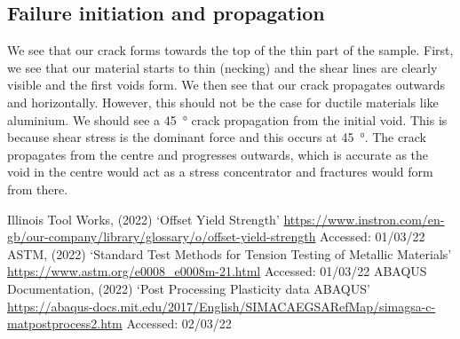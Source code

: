 \documentclass[11pt]{article}
\numberwithin{equation}{section}
\begin{document}
\subsection{Failure initiation and propagation}
We see that our crack forms towards the top of the thin part of the sample. First, we see that our material starts to thin (necking) and the shear lines are clearly visible and the first voids form. We then see that our crack propagates outwards and horizontally. However, this should not be the case for ductile materials like aluminium. We should see a \SI{45}{\degree} crack propagation from the initial void. This is because shear stress is the dominant force and this occurs at \SI{45}{\degree}. The crack propagates from the centre and progresses outwards, which is accurate as the void in the centre would act as a stress concentrator and fractures would form from there. 
\newpage
\begin{thebibliography}{00}
     Illinois Tool Works, (2022) `Offset Yield Strength' \url{https://www.instron.com/en-gb/our-company/library/glossary/o/offset-yield-strength} Accessed: 01/03/22
     ASTM, (2022) `Standard Test Methods for Tension Testing of Metallic Materials' \url{https://www.astm.org/e0008_e0008m-21.html} Accessed: 01/03/22
     ABAQUS Documentation, (2022) `Post Processing Plasticity data ABAQUS' \url{https://abaqus-docs.mit.edu/2017/English/SIMACAEGSARefMap/simagsa-c-matpostprocess2.htm} Accessed: 02/03/22
\end{thebibliography}
\end{document}
